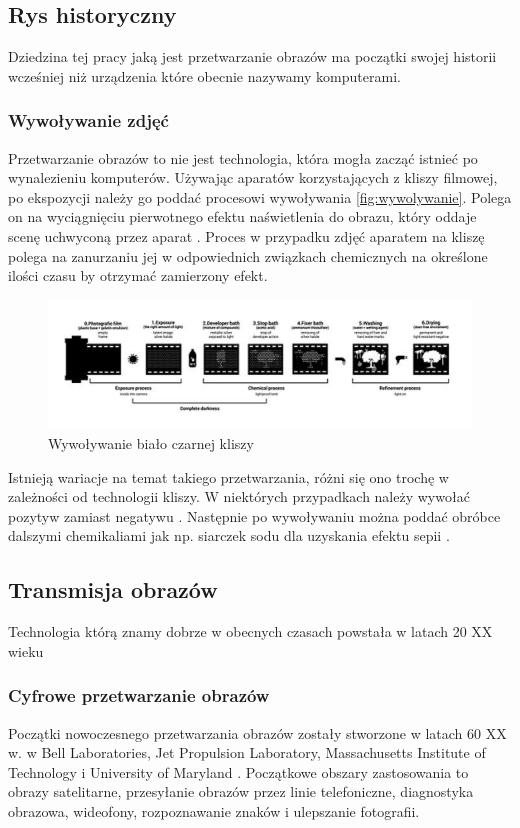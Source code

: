 \subsection{Rys historyczny}

Dziedzina tej pracy jaką jest przetwarzanie obrazów ma początki swojej historii wcześniej niż urządzenia które obecnie nazywamy komputerami.

\subsubsection{Wywoływanie zdjęć}
Przetwarzanie obrazów to nie jest technologia, która mogła zacząć istnieć po wynalezieniu komputerów. Używając aparatów korzystających z kliszy filmowej, po ekspozycji należy go poddać procesowi wywoływania \autoref{fig:wywolywanie}. 
Polega on na wyciągnięciu pierwotnego efektu naświetlenia do obrazu, który oddaje scenę uchwyconą przez aparat \cite{doi:https://doi.org/10.1002/14356007.a20_001}. Proces w przypadku zdjęć aparatem na kliszę polega na zanurzaniu jej w odpowiednich związkach chemicznych na określone ilości czasu by otrzymać zamierzony efekt. 

\begin{figure}[H]
    \centering
    \includegraphics{./images/Picture1.jpg}
    \caption{Wywoływanie biało czarnej kliszy}
    \label{fig:wywolywanie}
\end{figure}


Istnieją wariacje na temat takiego przetwarzania, różni się ono trochę w zależności od technologii kliszy. W niektórych przypadkach należy wywołać pozytyw zamiast negatywu \cite{almanac}. 
Następnie po wywoływaniu można poddać obróbce dalszymi chemikaliami jak np. siarczek sodu dla uzyskania efektu sepii \cite{sepia}. 

\subsection{Transmisja obrazów}
Technologia którą znamy dobrze w obecnych czasach powstała w latach 20 XX wieku

\subsubsection{Cyfrowe przetwarzanie obrazów}
Początki nowoczesnego przetwarzania obrazów zostały stworzone w latach 60 XX w. w Bell Laboratories, Jet Propulsion Laboratory, Massachusetts Institute of Technology i University of Maryland \cite{computerProcessing}. 
Początkowe obszary zastosowania to obrazy satelitarne, przesyłanie obrazów przez linie telefoniczne, diagnostyka obrazowa, wideofony, rozpoznawanie znaków i ulepszanie fotografii. 

